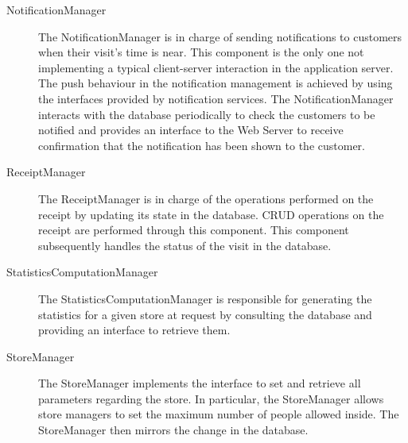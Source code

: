 \documentclass[../../main.tex]{subfiles}
\begin{document}
\begin{description}
    \item[NotificationManager] The NotificationManager is in charge of sending notifications to customers when their visit's time is near. 
    This component is the only one not implementing a typical client-server interaction in the application server. 
    The push behaviour in the notification management is achieved by using the interfaces provided by notification services.
    The NotificationManager interacts with the database periodically to check the customers to be notified and provides an interface
    to the Web Server to receive confirmation that the notification has been shown to the customer.

    \item[ReceiptManager] The ReceiptManager is in charge of the operations performed on the receipt by updating its 
    state in the database. CRUD operations on the receipt are performed through this component. This component subsequently handles
    the status of the visit in the database.
    
    \item[StatisticsComputationManager]  The StatisticsComputationManager is responsible for 
    generating the statistics for a given store at request by consulting the database and providing an interface to retrieve them.	  
     
    \item[StoreManager] The StoreManager implements the interface to set and retrieve all parameters regarding the store. 
    In particular, the StoreManager allows store managers to set the maximum number of people allowed inside. 
    The StoreManager then mirrors the change in the database. 
    
\end{description}
\end{document}
